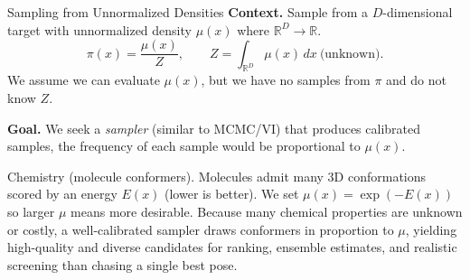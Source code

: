 \documentclass[aspectratio=169,xcolor=dvipsnames]{beamer}
\begin{document}
\begin{frame}[t]{Sampling from Unnormalized Densities}
\footnotesize
\textbf{Context.} Sample from a $D$-dimensional target with unnormalized density $\mu(x)$ where $\mathbb R^D \to \mathbb R$.
\[
\pi(x)=\frac{\mu(x)}{Z},\qquad Z=\int_{\mathbb R^D}\mu(x)\,dx\ \text{(unknown)}.
\]
We assume we can evaluate $\mu(x)$, but we have no samples from $\pi$ and do not know $Z$.

\vspace{0.1cm}

\medskip
\textbf{Goal.} We seek a \emph{sampler} (similar to MCMC/VI) that produces calibrated samples, the frequency of each sample would be proportional to $\mu(x)$.

\vspace{0.3cm}

\begin{block}{\scriptsize Chemistry (molecule conformers).} \scriptsize 
    Molecules admit many 3D conformations scored by an energy $E(x)$ (lower is better). We set $\mu(x)=\exp(-E(x))$ so larger $\mu$ means more desirable. Because many chemical properties are unknown or costly, a well-calibrated sampler draws conformers in proportion to $\mu$, yielding high-quality and diverse candidates for ranking, ensemble estimates, and realistic screening than chasing a single best pose.

\end{block}

\end{frame}
\end{document}
